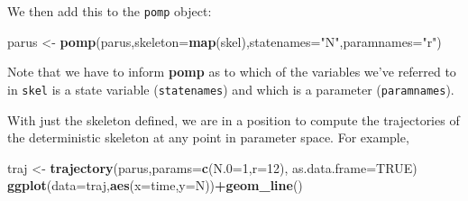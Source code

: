 \documentclass[]{article}
\newenvironment{Shaded}{\begin{snugshade}}{\end{snugshade}}
\newcommand{\KeywordTok}[1]{\textcolor[rgb]{0.13,0.29,0.53}{\textbf{#1}}}
\newcommand{\DataTypeTok}[1]{\textcolor[rgb]{0.13,0.29,0.53}{#1}}
\newcommand{\DecValTok}[1]{\textcolor[rgb]{0.00,0.00,0.81}{#1}}
\newcommand{\StringTok}[1]{\textcolor[rgb]{0.31,0.60,0.02}{#1}}
\newcommand{\OtherTok}[1]{\textcolor[rgb]{0.56,0.35,0.01}{#1}}
\newcommand{\OperatorTok}[1]{\textcolor[rgb]{0.81,0.36,0.00}{\textbf{#1}}}
\newcommand{\NormalTok}[1]{#1}
\begin{document}
We then add this to the \texttt{pomp} object:

\begin{Shaded}
\begin{Highlighting}[]
\NormalTok{parus <-}\StringTok{ }\KeywordTok{pomp}\NormalTok{(parus,}\DataTypeTok{skeleton=}\KeywordTok{map}\NormalTok{(skel),}\DataTypeTok{statenames=}\StringTok{"N"}\NormalTok{,}\DataTypeTok{paramnames=}\StringTok{"r"}\NormalTok{)}
\end{Highlighting}
\end{Shaded}

Note that we have to inform \textbf{pomp} as to which of the variables
we've referred to in \texttt{skel} is a state variable
(\texttt{statenames}) and which is a parameter (\texttt{paramnames}).

With just the skeleton defined, we are in a position to compute the
trajectories of the deterministic skeleton at any point in parameter
space. For example,

\begin{Shaded}
\begin{Highlighting}[]
\NormalTok{traj <-}\StringTok{ }\KeywordTok{trajectory}\NormalTok{(parus,}\DataTypeTok{params=}\KeywordTok{c}\NormalTok{(}\DataTypeTok{N.0=}\DecValTok{1}\NormalTok{,}\DataTypeTok{r=}\DecValTok{12}\NormalTok{), }\DataTypeTok{as.data.frame=}\OtherTok{TRUE}\NormalTok{)}
\KeywordTok{ggplot}\NormalTok{(}\DataTypeTok{data=}\NormalTok{traj,}\KeywordTok{aes}\NormalTok{(}\DataTypeTok{x=}\NormalTok{time,}\DataTypeTok{y=}\NormalTok{N))}\OperatorTok{+}\KeywordTok{geom_line}\NormalTok{()}
\end{Highlighting}
\end{Shaded}

\begin{center} \end{center}
\end{document}
